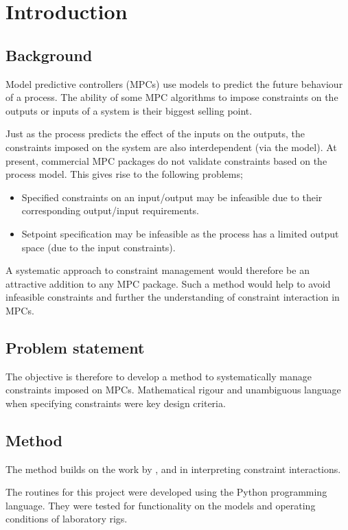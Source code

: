 \chapter{Introduction}\label{chap:intro}
\section{Background}
Model predictive controllers (MPCs) use models to predict the future behaviour of a process.
The ability of some MPC algorithms to impose constraints on the outputs or inputs of a system is their biggest selling point.

Just as the process predicts the effect of the inputs on the outputs, the constraints imposed on the system are also interdependent (via the model).
At present, commercial MPC packages do not validate constraints based on the process model.
This gives rise to the following problems;
\begin{itemize}
  \item Specified constraints on an input/output may be infeasible due to their corresponding output/input requirements.
  \item Setpoint specification may be infeasible as the process has a limited output space (due to the input constraints).
\end{itemize}

A systematic approach to constraint management would therefore be an attractive addition to any MPC package. 
Such a method would help to avoid infeasible constraints and further the understanding of constraint interaction in MPCs.

\section{Problem statement}
The objective is therefore to develop a method to systematically manage constraints imposed on MPCs.
Mathematical rigour and unambiguous language when specifying constraints were key design criteria.

\section{Method}
The method builds on the work by \citet{vinsonphd}, \citet{limaphd} and \citet{opconproc} in interpreting constraint interactions.

The routines for this project were developed using the Python programming language.
They were tested for functionality on the models and operating conditions of laboratory rigs.

